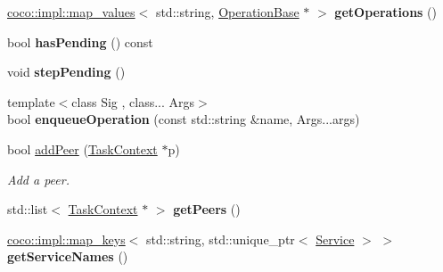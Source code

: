\begin{DoxyCompactItemize}
\item 
\hypertarget{classcoco_1_1_service_aa61573f9c66d645e6d64fa839a2ea1ca}{}\hyperlink{structcoco_1_1impl_1_1map__values}{coco\+::impl\+::map\+\_\+values}$<$ std\+::string, \hyperlink{classcoco_1_1_operation_base}{Operation\+Base} $\ast$ $>$ {\bfseries get\+Operations} ()\label{classcoco_1_1_service_aa61573f9c66d645e6d64fa839a2ea1ca}

\item 
\hypertarget{classcoco_1_1_service_a1615d5bae6a780044894056ae085b6a0}{}bool {\bfseries has\+Pending} () const \label{classcoco_1_1_service_a1615d5bae6a780044894056ae085b6a0}

\item 
\hypertarget{classcoco_1_1_service_a4f7e3408bf16da826159d02cf610a609}{}void {\bfseries step\+Pending} ()\label{classcoco_1_1_service_a4f7e3408bf16da826159d02cf610a609}

\item 
\hypertarget{classcoco_1_1_service_a2dec5e9cc69971620700035e66cff74d}{}{\footnotesize template$<$class Sig , class... Args$>$ }\\bool {\bfseries enqueue\+Operation} (const std\+::string \&name, Args...\+args)\label{classcoco_1_1_service_a2dec5e9cc69971620700035e66cff74d}

\item 
\hypertarget{classcoco_1_1_service_a452f324bff06c6d9f13a9c04b0184a13}{}bool \hyperlink{classcoco_1_1_service_a452f324bff06c6d9f13a9c04b0184a13}{add\+Peer} (\hyperlink{classcoco_1_1_task_context}{Task\+Context} $\ast$p)\label{classcoco_1_1_service_a452f324bff06c6d9f13a9c04b0184a13}

\begin{DoxyCompactList}\small\item\em Add a peer. \end{DoxyCompactList}\item 
\hypertarget{classcoco_1_1_service_aa02f55a16b0446ea2a3c3e7fa163da2e}{}std\+::list$<$ \hyperlink{classcoco_1_1_task_context}{Task\+Context} $\ast$ $>$ {\bfseries get\+Peers} ()\label{classcoco_1_1_service_aa02f55a16b0446ea2a3c3e7fa163da2e}

\item 
\hypertarget{classcoco_1_1_service_ad5de0a202461a0bbbfcd4922f000574b}{}\hyperlink{structcoco_1_1impl_1_1map__keys}{coco\+::impl\+::map\+\_\+keys}$<$ std\+::string, std\+::unique\+\_\+ptr$<$ \hyperlink{classcoco_1_1_service}{Service} $>$ $>$ {\bfseries get\+Service\+Names} ()\label{classcoco_1_1_service_ad5de0a202461a0bbbfcd4922f000574b}


\end{DoxyCompactItemize}
